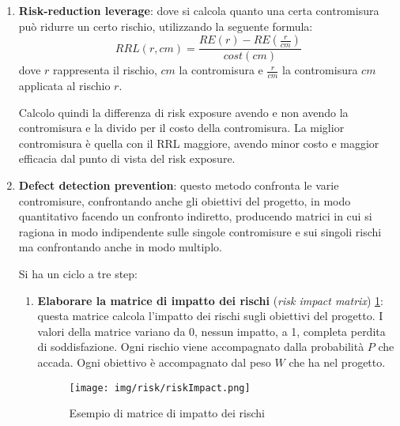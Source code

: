 \begin{enumerate}
    \item \textbf{Risk-reduction leverage}: dove si calcola quanto una certa
          contromisura può ridurre un certo rischio, utilizzando la seguente
          formula:
          \begin{equation}
              RRL(r, cm) = \frac{RE(r) - RE(\frac{r}{cm})}{cost(cm)}
          \end{equation}
          dove $r$ rappresenta il rischio, $cm$ la contromisura e $\frac{r}{cm}$
          la contromisura $cm$ applicata al rischio $r$.

          Calcolo quindi la differenza di risk exposure avendo e non avendo la
          contromisura e la divido per il costo della contromisura. La miglior
          contromisura è quella con il RRL maggiore, avendo minor costo e maggior
          efficacia dal punto di vista del risk exposure.
    \item \textbf{Defect detection prevention}: questo metodo confronta le varie
          contromisure, confrontando anche gli obiettivi del progetto, in modo
          quantitativo facendo un confronto indiretto, producendo matrici in cui
          si ragiona in modo indipendente sulle singole contromisure e sui singoli
          rischi ma confrontando anche in modo multiplo.

          Si ha un ciclo a tre step:
          \begin{enumerate}
              \item \textbf{Elaborare la matrice di impatto dei rischi} (\textit{risk
                        impact matrix}) \ref{fig:impact-matrix}: questa matrice
                    calcola l'impatto dei rischi sugli obiettivi del progetto.
                    I valori della matrice variano da 0, nessun impatto, a 1,
                    completa perdita di soddisfazione. Ogni rischio viene
                    accompagnato dalla probabilità $P$ che accada. Ogni obiettivo
                    è accompagnato dal peso $W$ che ha nel progetto.
                    \begin{figure}[!ht]
                        \centering
                        \texttt{[image: img/risk/riskImpact.png]}
                        \caption{Esempio di matrice di impatto dei rischi}
                        \label{fig:impact-matrix}
                    \end{figure}


\end{enumerate}
\end{enumerate}
